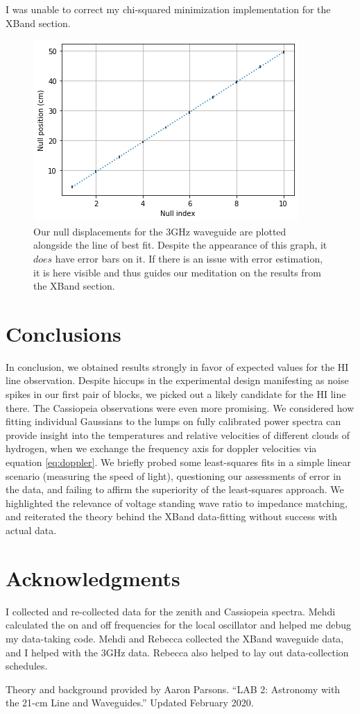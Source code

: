 \documentclass[12pt]{article}
\begin{document}
I was unable to correct my chi-squared minimization implementation for the XBand section.

\begin{figure}
\centering
	\includegraphics[width=.6\linewidth]{lame_waveguide}
	\caption{Our null displacements for the 3GHz waveguide are plotted alongside the line of best fit. Despite the appearance of this graph, it $does$ have error bars on it. If there is an issue with error estimation, it is here visible and thus guides our meditation on the results from the XBand section.}
	\label{fig:3GHz}
\end{figure}

\section{Conclusions}

\quad \quad In conclusion, we obtained results strongly in favor of expected values for the HI line observation. Despite hiccups in the experimental design manifesting as noise spikes in our first pair of blocks, we picked out a likely candidate for the HI line there. The Cassiopeia observations were even more promising. We considered how fitting individual Gaussians to the lumps on fully calibrated power spectra can provide insight into the temperatures and relative velocities of different clouds of hydrogen, when we exchange the frequency axis for doppler velocities via equation \ref{eq:doppler}. We briefly probed some least-squares fits in a simple linear scenario (measuring the speed of light), questioning our assessments of error in the data, and failing to affirm the superiority of the least-squares approach. We highlighted the relevance of voltage standing wave ratio to impedance matching, and reiterated the theory behind the XBand data-fitting without success with actual data. 

\section{Acknowledgments}

\quad \quad I collected and re-collected data for the zenith and Cassiopeia spectra. Mehdi calculated the on and off frequencies for the local oscillator and helped me debug my data-taking code. Mehdi and Rebecca collected the XBand waveguide data, and I helped with the 3GHz data. Rebecca also helped to lay out data-collection schedules.

Theory and background provided by Aaron Parsons. ``LAB 2: Astronomy with the 21-cm Line and Waveguides.'' Updated February 2020.
\end{document}
